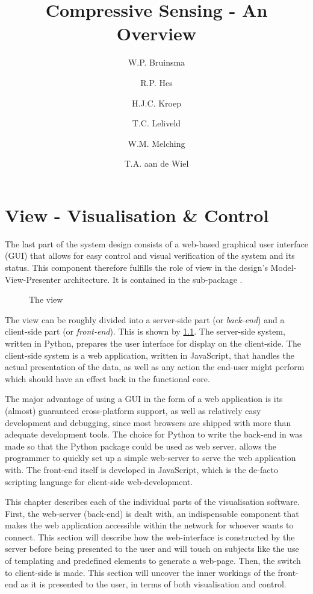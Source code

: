 \documentclass[a4paper, openany, oneside]{memoir}
\title{Compressive Sensing - An Overview}
\author{W.P. Bruinsma \and R.P. Hes \and H.J.C. Kroep \and T.C. Leliveld \and W.M. Melching \and T.A. aan de Wiel}
\begin{document}
\chapter{View - Visualisation \& Control}
\label{cha:view}
The last part of the system design consists of a web-based graphical user interface (GUI) that allows for easy control and visual verification of the system and its status. This component therefore fulfills the role of view in the design's Model-View-Presenter architecture. It is contained in the sub-package .

\begin{figure}[h]
    \centering
    \begin{adjustbox}{width=0.7\textwidth}
    
    \end{adjustbox}
    \caption{The view}
    \label{fig:view-diagram}
\end{figure}

The view can be roughly divided into a server-side part (or \emph{back-end}) and a client-side part (or \emph{front-end}). This is shown by \cref{fig:view-diagram}. The server-side system, written in Python, prepares the user interface for display on the client-side. The client-side system is a web application, written in JavaScript, that handles the actual presentation of the data, as well as any action the end-user might perform which should have an effect back in the functional core.

The major advantage of using a GUI in the form of a web application is its (almost) guaranteed cross-platform support, as well as relatively easy development and debugging, since most browsers are shipped with more than adequate development tools.
The choice for Python to write the back-end in was made so that the  Python package could be used as web server.  allows the programmer to quickly set up a simple web-server to serve the web application with.
The front-end itself is developed in JavaScript, which is the de-facto scripting language for client-side web-development.

This chapter describes each of the individual parts of the visualisation software.
First, the web-server (back-end) is dealt with, an indispensable component that makes the web application accessible within the network for whoever wants to connect. This section will describe how the web-interface is constructed by the server before being presented to the user and will touch on subjects like the use of templating and predefined elements to generate a web-page.
Then, the switch to client-side is made. This section will uncover the inner workings of the front-end as it is presented to the user, in terms of both visualisation and control.
\end{document}
